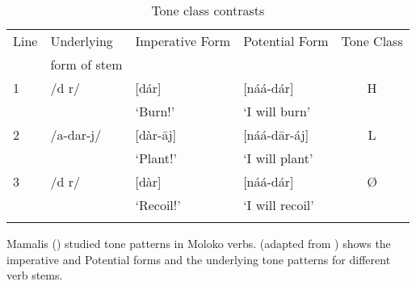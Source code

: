 \begin{table}
\begin{tabular}{llllc}
\lsptoprule
{Line} & {Underlying } & {Imperative Form} & {Potential Form} & {Tone Class}\\
& {form of stem}\\\midrule
{1} & /d r/ & [dár] & [náá-dár] & {H}\\

& & ‘Burn!’ & ‘I will burn’ \\
{2} & /a-dar-j/ & [dàr-\={a}j] & [náá-d\={a}r-áj] & {L}\\

& & ‘Plant!’ &  ‘I will plant’ & \\
{3} & /d r/ & [dàr] & [náá-dár] & Ø\\

& & ‘Recoil!’ & ‘I will recoil’ \\
\lspbottomrule
\end{tabular}
\caption{Tone class contrasts \label{tab:44}}
\end{table}

Mamalis (\citealt{FriesenMamalis2008}) studied tone patterns in Moloko verbs.  (adapted from \citealt{FriesenMamalis2008}) shows the imperative and Potential forms and the underlying tone patterns for different verb stems. 


